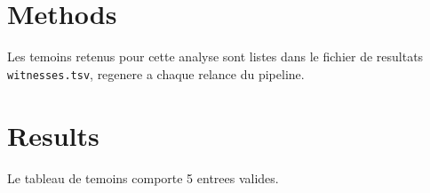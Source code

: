 \documentclass{article}
\begin{document}
\section{Methods}
Les temoins retenus pour cette analyse sont listes dans le fichier de resultats
\texttt{witnesses.tsv}, regenere a chaque relance du pipeline.

\section{Results}
Le tableau de temoins comporte 5 entrees valides.
\end{document}
